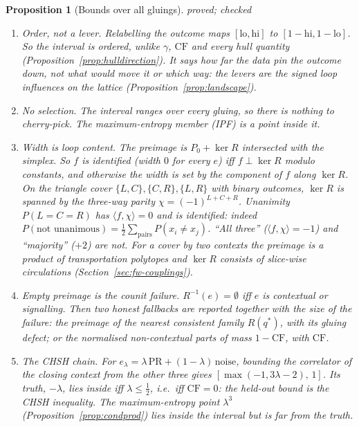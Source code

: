 \documentclass[11pt]{article}
\newtheorem{proposition}[theorem]{Proposition}
\theoremstyle{definition}
\theoremstyle{remark}
\newcommand{\CF}{\mathrm{CF}}
\newcommand{\st}[1]{\textsf{\small\color{gray}#1}}
\begin{document}
\begin{proposition}[Bounds over all gluings]\label{prop:bounds}\st{proved; checked}
\leavevmode
\begin{enumerate}
  \item \emph{Order, not a lever.} Relabelling the outcome maps $[\mathrm{lo},\mathrm{hi}]$ to $[1-\mathrm{hi},1-\mathrm{lo}]$. So the interval is ordered, unlike $\gamma$, $\CF$ and every hull quantity (Proposition~\ref{prop:hulldirection}). It says how far the data pin the outcome down, not what would move it or which way: the levers are the signed loop influences on the lattice (Proposition~\ref{prop:landscape}).
  \item \emph{No selection.} The interval ranges over every gluing, so there is nothing to cherry-pick. The maximum-entropy member (IPF) is a point inside it.
  \item \emph{Width is loop content.} The preimage is $P_0+\ker R$ intersected with the simplex. So $f$ is \emph{identified} (width $0$ for every $e$) iff $f\perp\ker R$ modulo constants, and otherwise the width is set by the component of $f$ along $\ker R$. On the triangle cover $\{L,C\},\{C,R\},\{L,R\}$ with binary outcomes, $\ker R$ is spanned by the three-way parity $\chi=(-1)^{L+C+R}$. Unanimity $P(L=C=R)$ has $\langle f,\chi\rangle=0$ and is identified: indeed $P(\text{not unanimous})=\tfrac12\sum_{\text{pairs}}P(x_i\ne x_j)$. ``All three'' ($\langle f,\chi\rangle=-1$) and ``majority'' ($+2$) are not. For a cover by two contexts the preimage is a product of transportation polytopes and $\ker R$ consists of slice-wise circulations (Section~\ref{sec:fw-couplings}).
  \item \emph{Empty preimage is the counit failure.} $R^{-1}(e)=\emptyset$ iff $e$ is contextual or signalling. Then two honest fallbacks are reported together with the size of the failure: the preimage of the nearest consistent family $R(q^\ast)$, with its gluing defect; or the normalised non-contextual parts of mass $1-\CF$, with $\CF$.
  \item \emph{The CHSH chain.} For $e_\lambda=\lambda\,\mathrm{PR}+(1-\lambda)\,\mathrm{noise}$, bounding the correlator of the closing context from the other three gives $[\max(-1,3\lambda-2),\,1]$. Its truth, $-\lambda$, lies inside iff $\lambda\le\tfrac12$, i.e.\ iff $\CF=0$: the held-out bound \emph{is} the CHSH inequality. The maximum-entropy point $\lambda^3$ (Proposition~\ref{prop:condprod}) lies inside the interval but is far from the truth.
\end{enumerate}
\end{proposition}
\end{document}
